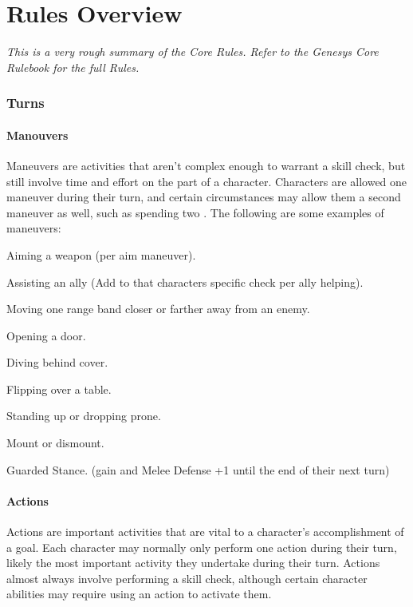 \chapter{Rules Overview}\label{chap:rules_overview}

\begin{centering}
    \textit{This is a very rough summary of the Core Rules. Refer to the Genesys Core Rulebook for the full Rules.}
\end{centering}

\begin{multicols}{2}

\subsection{Turns}
\subsubsection{Manouvers}
Maneuvers are activities that aren’t complex enough to
warrant a skill check, but still involve time and effort
on the part of a character. Characters are allowed one
maneuver during their turn, and certain circumstances
may allow them a second maneuver as well, such as spending two \advantage.
The following are some examples of maneuvers:
\begin{description}
    \item Aiming a weapon (\boost per aim maneuver).
    \item Assisting an ally (Add \boost to that characters specific check per ally helping).
    \item Moving one range band closer or farther away from an enemy.
    \item Opening a door.
    \item Diving behind cover.
    \item Flipping over a table.
    \item Standing up or dropping prone.
    \item Mount or dismount.
    \item Guarded Stance. (gain \setback and Melee Defense +1 until the end of their next turn)
\end{description}

\subsubsection{Actions}
Actions are important activities that are vital to a character's accomplishment
of a goal. Each character may normally only perform one action during their
turn, likely the most important activity they undertake during their turn.
Actions almost always involve performing a skill check, although certain
character abilities may require using an action to activate them.


\end{multicols}
